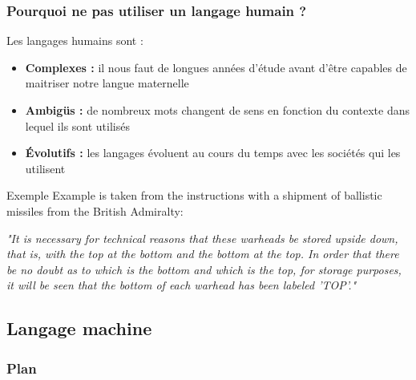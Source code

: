 \documentclass[utf8,10pt]{beamer}
\begin{document}
\begin{frame}
	\frametitle{Pourquoi ne pas utiliser un langage humain ?}
	
	Les langages humains sont :
	\begin{itemize}
		\item \textbf{Complexes :} il nous faut de longues années d'étude avant d'être capables de maitriser notre langue maternelle
		\item \textbf{Ambigüs :} de nombreux mots changent de sens en fonction du contexte dans lequel ils sont utilisés
		\item \textbf{Évolutifs :} les langages évoluent au cours du temps avec les sociétés qui les utilisent 
	\end{itemize}
	
	\begin{exampleblock}{Exemple}
	Example is taken from the instructions with a shipment of ballistic missiles from the British Admiralty:
	
		\emph{"It is necessary for technical reasons that these warheads be stored upside down, that is, with the top at the bottom and the bottom at the top. In order that there be no doubt as to which is the bottom and which is the top, for storage purposes, it will be seen that the bottom of each warhead has been labeled ’TOP’."}
	\end{exampleblock}
\end{frame}

\subsection{Langage machine}

\begin{frame}

	\frametitle{Plan}
	
	\tableofcontents[currentsubsection]
\end{frame}
\end{document}
